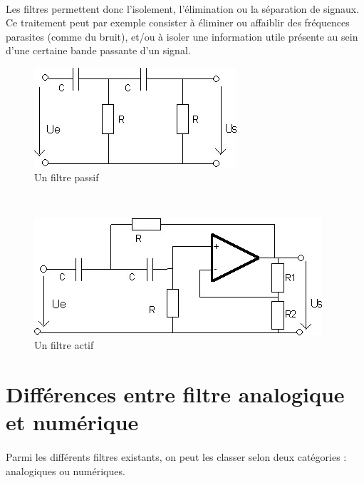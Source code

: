 \documentclass[a4paper,11pt]{article}
\begin{document}
    \paragraph{}
Les filtres permettent donc l’isolement, l’élimination ou la séparation de signaux.
Ce traitement peut par exemple consister à éliminer ou affaiblir des fréquences parasites (comme du bruit),
et/ou à isoler une information utile présente au sein d'une certaine bande passante d'un signal.
    \\
    \begin{figure}[h]
        \begin{center}
            \includegraphics[scale=0.7]{images/filtres/filtre-passif.jpg}
        \end{center}
            \caption{ Un filtre passif }
            \label{Un exemple de filtre passif}
    \end{figure}
    \\
    \begin{figure}[h]
        \begin{center}
            \includegraphics[scale=0.7]{images/filtres/filtre-actif.jpg}
        \end{center}
            \caption{ Un filtre actif }
            \label{Un exemple de filtre actif}
    \end{figure}

    \clearpage


\section{Différences entre filtre analogique et numérique}
    \paragraph{}
Parmi les différents filtres existants, on peut les classer selon deux catégories : analogiques ou numériques.
\end{document}
